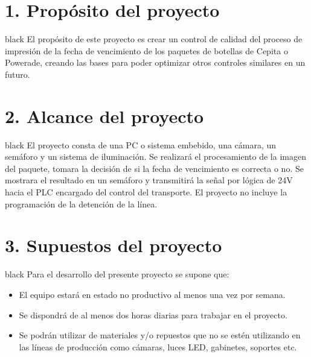 \documentclass[11pt]{charter}
\begin{document}
\section{1. Propósito del proyecto}
\label{sec:proposito}

\begin{consigna}{black}
El propósito de este proyecto es crear un control de calidad del proceso de impresión de la fecha de vencimiento de los paquetes de botellas de Cepita o Powerade, creando las bases para poder optimizar otros controles similares en un futuro.

\end{consigna}

\section{2. Alcance del proyecto}
\label{sec:alcance}

\begin{consigna}{black}
El proyecto consta de una PC o sistema embebido, una cámara, un semáforo y un sistema de iluminación. \newline
Se realizará el procesamiento de la imagen del paquete, tomara la decisión de si la fecha de vencimiento es correcta o no. \newline
Se mostrara el resultado en un semáforo y transmitirá la señal por lógica de 24V hacia el PLC encargado del control del transporte. El proyecto no incluye la programación de la detención de la línea.
%
%
%
%
\end{consigna}


\section{3. Supuestos del proyecto}
\label{sec:supuestos}

\begin{consigna}{black}
Para el desarrollo del presente proyecto se supone que:

\begin{itemize}
\item El equipo estará en estado no productivo al menos una vez por semana.
\item Se dispondrá de al menos dos horas diarias para trabajar en el proyecto.
\item Se podrán utilizar de materiales y/o repuestos que no se estén utilizando en las líneas de producción como cámaras, luces LED, gabinetes, soportes etc.

\end{itemize}

\end{consigna}
\end{document}
